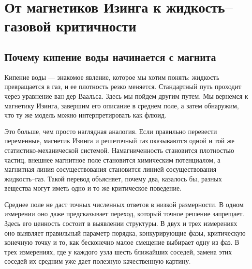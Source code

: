 \chapter{От магнетиков Изинга к жидкость--газовой критичности}


\section{Почему кипение воды начинается с магнита}

Кипение воды — знакомое явление, которое мы хотим понять: жидкость превращается в газ, и ее плотность резко меняется. Стандартный путь проходит через уравнение ван-дер-Ваальса. Здесь мы пойдем другим путем. Мы вернемся к магнетику Изинга, завершим его описание в среднем поле, а затем обнаружим, что ту же модель можно интерпретировать как флюид.

Это больше, чем просто наглядная аналогия. Если правильно перевести переменные, магнетик Изинга и решеточный газ оказываются одной и той же статистико-механической системой. Намагниченность становится плотностью частиц, внешнее магнитное поле становится химическим потенциалом, а магнитная линия сосуществования становится линией сосуществования жидкость--газ. Такой перевод объясняет, почему два, казалось бы, разных вещества могут иметь одно и то же критическое поведение.

Среднее поле не даст точных численных ответов в низкой размерности. В одном измерении оно даже предсказывает переход, который точное решение запрещает. Здесь его ценность состоит в выявлении структуры. В двух и трех измерениях оно выявляет правильный параметр порядка, конкурирующие фазы, критическую конечную точку и то, как бесконечно малое смещение выбирает одну из фаз. В трех измерениях, где у каждого узла шесть ближайших соседей, замена этих соседей их средним уже дает полезную качественную картину.

